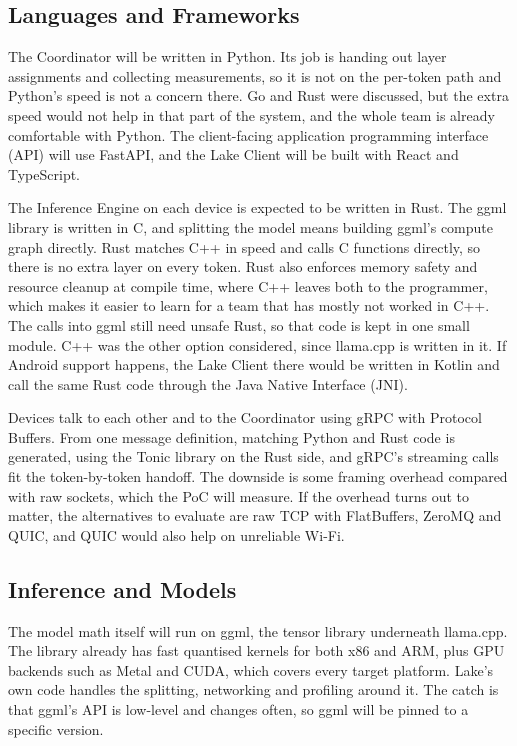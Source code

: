 \documentclass{article}
\begin{document}
\subsection{Languages and Frameworks}

The Coordinator will be written in Python. Its job is handing out layer
assignments and collecting measurements, so it is not on the per-token path
and Python's speed is not a concern there. Go and Rust were discussed, but the
extra speed would not help in that part of the system, and the whole team is
already comfortable with Python. The client-facing application programming
interface (API) will use FastAPI, and the Lake Client will be built with React
and TypeScript.

The Inference Engine on each device is expected to be written in Rust. The
ggml library is written in C, and splitting the model means building ggml's
compute graph directly. Rust matches C++ in speed and calls C functions
directly, so there is no extra layer on every token. Rust also enforces memory
safety and resource cleanup at compile time, where C++ leaves both to the
programmer, which makes it easier to learn for a team that has mostly not
worked in C++. The calls into ggml still need unsafe Rust, so that code is kept
in one small module. C++ was the other option considered, since llama.cpp is
written in it. If Android support happens, the Lake Client there would be
written in Kotlin and call the same Rust code through the Java Native
Interface (JNI).

Devices talk to each other and to the Coordinator using gRPC with Protocol
Buffers. From one message definition, matching Python and Rust code is
generated, using the Tonic library on the Rust side, and gRPC's streaming calls
fit the token-by-token handoff. The downside is
some framing overhead compared with raw sockets, which the PoC will measure.
If the overhead turns out to matter, the alternatives to evaluate are raw TCP
with FlatBuffers, ZeroMQ and QUIC, and QUIC would also help on unreliable
Wi-Fi.

\subsection{Inference and Models}

The model math itself will run on ggml, the tensor library underneath
llama.cpp. The library already has fast quantised kernels for both x86 and
ARM, plus GPU backends such as Metal and CUDA, which covers every target
platform. Lake's own code handles the splitting, networking and profiling
around it. The catch is that ggml's API is low-level and changes often, so
ggml will be pinned to a specific version.
\end{document}
